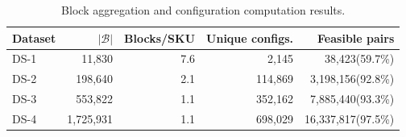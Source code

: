 \begin{table}[htbp]
\centering
\caption{Block aggregation and configuration computation results.}
\label{tab:datasets_bloques}
\begin{tabular}{@{}lrrrr@{}}
\toprule
\textbf{Dataset} & \textbf{$|\mathcal{B}|$} & \textbf{Blocks/SKU} & \textbf{Unique configs.} & \textbf{Feasible pairs} \\
\midrule
DS-1 & 11{,}830 & 7.6 & 2{,}145 & 38{,}423\phantom{0}(59.7\%) \\
DS-2 & 198{,}640 & 2.1 & 114{,}869 & 3{,}198{,}156\phantom{0}(92.8\%) \\
DS-3 & 553{,}822 & 1.1 & 352{,}162 & 7{,}885{,}440\phantom{0}(93.3\%) \\
DS-4 & 1{,}725{,}931 & 1.1 & 698{,}029 & 16{,}337{,}817\phantom{0}(97.5\%) \\
\bottomrule
\end{tabular}
\end{table}